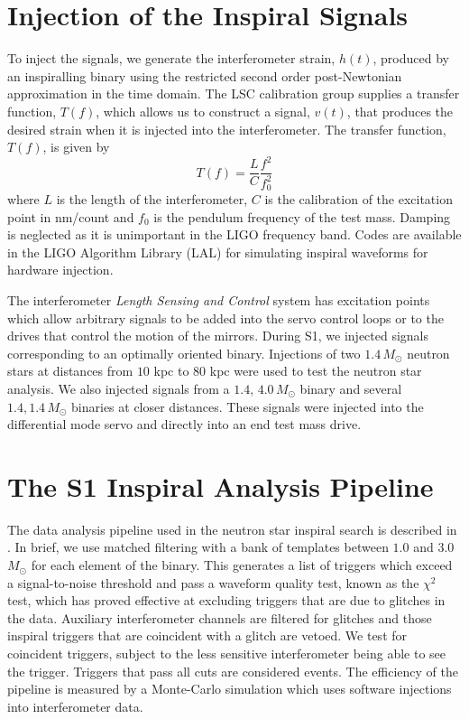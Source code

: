 \section{Injection of the Inspiral Signals}
\label{s:injecting}

To inject the signals, we generate the interferometer strain, $h(t)$, produced
by an inspiralling binary using the restricted second order post-Newtonian
approximation in the time domain\cite{biww}.  The LSC calibration group
supplies a transfer function, $T(f)$, which allows us to construct a signal,
$v(t)$, that produces the desired strain when it is injected into the
interferometer.  The transfer function, $T(f)$, is given by \begin{equation}
T(f) = \frac{L}{C}\frac{f^2}{f_0^2}
\end{equation}
where $L$ is the length of the interferometer, $C$ is the calibration of the
excitation point in nm/count and $f_0$ is the pendulum frequency of the test
mass. Damping is neglected as it is unimportant in the LIGO frequency band.
Codes are available in the LIGO Algorithm Library (LAL)\cite{lal} for
simulating inspiral waveforms for hardware injection.

The interferometer \emph{Length Sensing and Control} system\cite{abbott2003a}
has excitation points which allow arbitrary signals to be added into the servo
control loops or to the drives that control the motion of the
mirrors\cite{shawhan2002}. 
During S1, we injected signals corresponding to an optimally oriented binary.
Injections of two $1.4\,M_\odot$ neutron stars at distances from $10$ kpc to
$80$ kpc were used to test the neutron star analysis. 
We also injected signals from a $1.4,\,4.0\,M_\odot$ binary and several
$1.4,1.4\,M_\odot$ binaries at closer distances.  These signals were injected
into the differential mode servo and directly into an end test mass drive.

\section{The S1 Inspiral Analysis Pipeline}
\label{ss:pipeline}

The data analysis pipeline used in the neutron star inspiral search is
described in \cite{abbott2003b}. In brief, we use matched filtering with a
bank of templates between $1.0$ and $3.0$ $M_\odot$ for each element of the
binary. This generates a list of triggers which exceed a signal-to-noise
threshold and pass a waveform quality test, known as the $\chi^2$ test, which
has proved effective at excluding triggers that are due to glitches in the
data. Auxiliary interferometer channels are filtered for glitches and those
inspiral triggers that are coincident with a glitch are vetoed.  We test for
coincident triggers, subject to the less sensitive interferometer being able
to see the trigger. Triggers that pass all cuts are considered events.  The
efficiency of the pipeline is measured by a Monte-Carlo simulation which uses
software injections into interferometer data.

